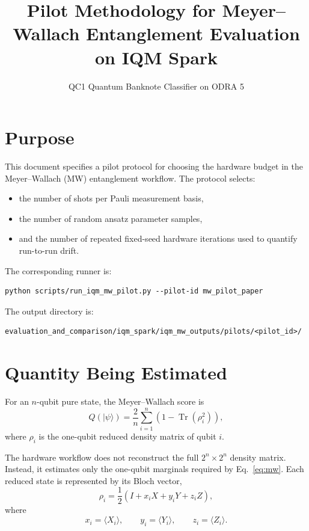 \documentclass[11pt]{article}
\title{Pilot Methodology for Meyer--Wallach Entanglement Evaluation on IQM Spark}
\author{QC1 Quantum Banknote Classifier on ODRA 5}
\date{}
\begin{document}
\maketitle

\section{Purpose}

This document specifies a pilot protocol for choosing the hardware budget in the
Meyer--Wallach (MW) entanglement workflow. The protocol selects:
\begin{itemize}
  \item the number of shots per Pauli measurement basis,
  \item the number of random ansatz parameter samples,
  \item and the number of repeated fixed-seed hardware iterations used to
  quantify run-to-run drift.
\end{itemize}

The corresponding runner is:
\begin{verbatim}
python scripts/run_iqm_mw_pilot.py --pilot-id mw_pilot_paper
\end{verbatim}

The output directory is:
\begin{verbatim}
evaluation_and_comparison/iqm_spark/iqm_mw_outputs/pilots/<pilot_id>/
\end{verbatim}

\section{Quantity Being Estimated}

For an \(n\)-qubit pure state, the Meyer--Wallach score is
\begin{equation}
Q(|\psi\rangle)
=
\frac{2}{n}
\sum_{i=1}^{n}
\left(1-\operatorname{Tr}(\rho_i^2)\right),
\label{eq:mw}
\end{equation}
where \(\rho_i\) is the one-qubit reduced density matrix of qubit \(i\).

The hardware workflow does not reconstruct the full \(2^n \times 2^n\) density
matrix. Instead, it estimates only the one-qubit marginals required by
Eq.~\eqref{eq:mw}. Each reduced state is represented by its Bloch vector,
\begin{equation}
\rho_i
=
\frac{1}{2}
\left(I+x_iX+y_iY+z_iZ\right),
\label{eq:bloch}
\end{equation}
where
\begin{equation}
x_i=\langle X_i\rangle,\qquad
y_i=\langle Y_i\rangle,\qquad
z_i=\langle Z_i\rangle.
\end{equation}
\end{document}
